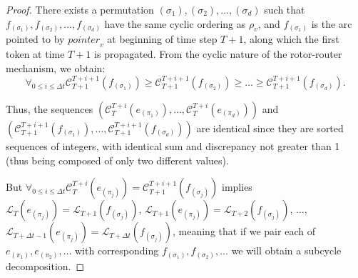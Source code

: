 \documentclass{article}[11pt,letter]
\newcommand{\load}{\mathcal{L}}
\newcommand{\cload}{\mathcal{C}}
\newcommand{\dt}{\Delta t}
\newcommand{\pointer}{\mathit{pointer}}
\begin{document}
\begin{proof}
There exists a permutation $(\sigma_1),(\sigma_2),\ldots,(\sigma_d)$ such that $f_{(\sigma_1)},f_{(\sigma_2)},\ldots,f_{(\sigma_d)}$ have the same cyclic ordering as $\rho_v$, and $f_{(\sigma_1)}$ is the arc pointed to by $\pointer_v$ at beginning of time step $T+1$, along which the first token at time $T+1$ is propagated. From the cyclic nature of the rotor-router mechanism, we obtain:
$$
\forall_{0 \le i \le \dt} \cload_{T+1}^{T+i+1}(f_{(\sigma_1)}) \ge \cload_{T+1}^{T+i+1}(f_{(\sigma_2)}) \ge \ldots \ge \cload_{T+1}^{T+i+1}(f_{(\sigma_d)}).
$$

Thus, the sequences $\left(\cload_{T}^{T+i}(e_{(\pi_1)}),\ldots,\cload_{T}^{T+i}(e_{(\pi_d)})\right)$ and  \\$\left(\cload_{T+1}^{T+i+1}(f_{(\sigma_1)}),\ldots,\cload_{T+1}^{T+i+1}(f_{(\sigma_d)})\right)$ are identical since they are sorted sequences of integers, with identical sum and discrepancy not greater than 1 (thus being composed of only two different values).

But $\forall_{0 \le i \le \dt} \cload_{T}^{T+i}(e_{(\pi_j)}) = \cload_{T+1}^{T+i+1}(f_{(\sigma_j)})$ implies $\load_{T}(e_{(\pi_j)}) = \load_{T+1}(f_{(\sigma_j)})$, $\load_{T+1}(e_{(\pi_j)}) = \load_{T+2}(f_{(\sigma_j)})$, $\ldots$, $\load_{T+\dt-1}(e_{(\pi_j)}) = \load_{T+\dt}(f_{(\sigma_j)})$,
meaning that if we pair each of $e_{(\pi_1)},e_{(\pi_2)},\ldots$ with corresponding $f_{(\sigma_1)},f_{(\sigma_2)},\ldots$ we will obtain a subcycle decomposition.

\end{proof}
\end{document}
